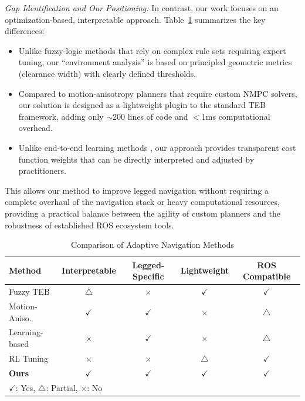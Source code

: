\documentclass[lettersize,journal]{IEEEtran}
\begin{document}
\textit{Gap Identification and Our Positioning:} In contrast, our work focuses on an optimization-based, interpretable approach. Table~\ref{tab:comparison} summarizes the key differences:
\begin{itemize}
\item Unlike fuzzy-logic methods \cite{zheng_fuzzy_2023} that rely on complex rule sets requiring expert tuning, our ``environment analysis'' is based on principled geometric metrics (clearance width) with clearly defined thresholds.
\item Compared to motion-anisotropy planners \cite{zhangAgileSafeTrajectory2024} that require custom NMPC solvers, our solution is designed as a lightweight plugin to the standard TEB framework, adding only $\sim$200 lines of code and $<$1ms computational overhead.
\item Unlike end-to-end learning methods \cite{kolvenbachLearningbasedObstacleAvoidance2022}, our approach provides transparent cost function weights that can be directly interpreted and adjusted by practitioners.
\end{itemize}
This allows our method to improve legged navigation without requiring a complete overhaul of the navigation stack or heavy computational resources, providing a practical balance between the agility of custom planners and the robustness of established ROS ecosystem tools.

\begin{table}[!t]  %
\centering
\caption{Comparison of Adaptive Navigation Methods}
\label{tab:comparison}
\begin{tabular}{l|cccc}
\hline
\textbf{Method} & \textbf{Interpretable} & \textbf{Legged-Specific} & \textbf{Lightweight} & \textbf{ROS Compatible} \\
\hline
Fuzzy TEB \cite{zheng_fuzzy_2023} & $\triangle$ & $\times$ & $\checkmark$ & $\checkmark$ \\
Motion-Aniso. \cite{zhangAgileSafeTrajectory2024} & $\checkmark$ & $\checkmark$ & $\times$ & $\triangle$ \\
Learning-based \cite{kolvenbachLearningbasedObstacleAvoidance2022} & $\times$ & $\checkmark$ & $\times$ & $\triangle$ \\
RL Tuning \cite{gaoAdaptiveNavigationMobile2020} & $\times$ & $\times$ & $\triangle$ & $\checkmark$ \\
\textbf{Ours} & $\checkmark$ & $\checkmark$ & $\checkmark$ & $\checkmark$ \\
\hline
\multicolumn{5}{l}{\footnotesize $\checkmark$: Yes, $\triangle$: Partial, $\times$: No}
\end{tabular}
\end{table}
\end{document}
